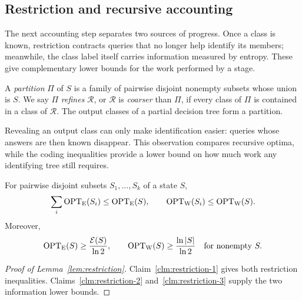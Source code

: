 

\subsection{Restriction and recursive accounting}

The next accounting step separates two sources of progress. Once a
class is known, restriction contracts queries that no longer help
identify its members; meanwhile, the class label itself carries
information measured by entropy. These give complementary lower bounds
for the work performed by a stage.

\begin{definition}\label{def:partitions}
A \emph{partition} $\Pi$ of $S$ is a family of pairwise disjoint
nonempty subsets whose union is $S$. We say $\Pi$ \emph{refines}
$\mathcal R$, or $\mathcal R$ is \emph{coarser} than $\Pi$, if
every class of $\Pi$ is contained in a class of $\mathcal R$.
The output classes of a partial decision tree form a partition.
\end{definition}

Revealing an output class can only make identification easier: queries
whose answers are then known disappear. This observation compares
recursive optima, while the coding inequalities provide a lower bound
on how much work any identifying tree still requires.

\begin{lemma}\label{lem:restriction}
For pairwise disjoint subsets $S_1,\ldots,S_k$ of a state $S$,
\[
 \sum_i \operatorname{OPT}_{\mathrm E}(S_i)\le \operatorname{OPT}_{\mathrm E}(S),\qquad
 \operatorname{OPT}_{\mathrm W}(S_i)\le \operatorname{OPT}_{\mathrm W}(S).
\]
Moreover,
\[
 \operatorname{OPT}_{\mathrm E}(S)\ge\frac{\mathcal E(S)}{\ln2},
 \qquad
 \operatorname{OPT}_{\mathrm W}(S)\ge\frac{\ln|S|}{\ln2}
 \quad\text{for nonempty }S.
\]
\end{lemma}
\begin{proof}[Proof of Lemma~\ref{lem:restriction}]
Claim~\ref{clm:restriction-1} gives both restriction inequalities.
Claims~\ref{clm:restriction-2} and~\ref{clm:restriction-3} supply
the two information lower bounds.
\end{proof}


